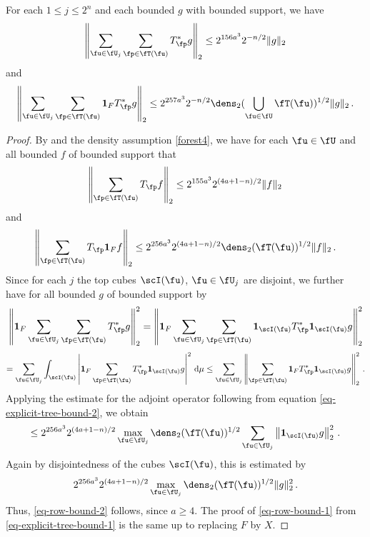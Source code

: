 \begin{lemma}
    \label{row-bound}
    For each $1 \le j \le 2^n$ and each bounded $g$ with bounded support, we have
    \begin{equation}
        \label{eq-row-bound-1}
        \left\| \sum_{\fu \in \fU_j} \sum_{\fp \in \fT(\fu)} T_{\fp}^* g\right\|_2 \le 2^{156a^3} 2^{-n/2} \|g\|_2
    \end{equation}
    and
    \begin{equation}
        \label{eq-row-bound-2}
        \left\| \sum_{\fu \in \fU_j} \sum_{\fp \in \fT(\fu)} \mathbf{1}_F T_{\fp}^* g\right\|_2 \le 2^{257a^3} 2^{-n/2} \dens_2(\bigcup_{\fu\in \fU}\fT(\fu))^{1/2} \|g\|_2\,.
    \end{equation}
\end{lemma}

\begin{proof}
    By  and the density assumption \eqref{forest4}, we have for each $\fu \in \fU$ and all bounded $f$ of bounded support that
    \begin{equation}
        \label{eq-explicit-tree-bound-1}
        \left\|\sum_{\fp \in \fT(\fu)} T_{\fp} f \right\|_{2} \le 2^{155a^3} 2^{(4a+1-n)/2} \|f\|_2\,
    \end{equation}
    and
    \begin{equation}
        \label{eq-explicit-tree-bound-2}
        \left\|\sum_{\fp \in \fT(\fu)} T_{\fp} \mathbf{1}_F f \right\|_{2} \le 2^{256a^3} 2^{(4a + 1-n)/2} \dens_2(\fT(\fu))^{1/2} \|f\|_2\,.
    \end{equation}
    Since for each $j$ the top cubes $\scI(\fu)$, $\fu \in \fU_j$ are disjoint, we further have for all bounded $g$ of bounded support by 
    $$
        \left\|\mathbf{1}_F \sum_{\fu \in \fU_j} \sum_{\fp \in \fT(\fu)} T_{\fp}^* g\right\|_2^2 = \left\|\mathbf{1}_F \sum_{\fu \in \fU_j} \sum_{\fp \in \fT(\fu)} \mathbf{1}_{\scI(\fu)} T_{\fp}^* \mathbf{1}_{\scI(\fu)} g\right\|_2^2
    $$
    $$
        = \sum_{\fu \in \fU_j} \int_{\scI(\fu)} \left| \mathbf{1}_F \sum_{\fp \in \fT(\fu)} T_{\fp}^* \mathbf{1}_{\scI(\fu)} g\right|^2 \, \mathrm{d}\mu
        \le \sum_{\fu \in \fU_j} \left\|\sum_{\fp \in \fT(\fu)} \mathbf{1}_F T_{\fp}^* \mathbf{1}_{\scI(\fu)} g\right\|_2^2\,.
    $$
    Applying the estimate for the adjoint operator following from equation \eqref{eq-explicit-tree-bound-2}, we obtain
    $$
        \le 2^{256a^3} 2^{(4a+1-n)/2} \max_{\fu \in \fU_j}\dens_2(\fT(\fu))^{1/2} \sum_{\fu \in \fU_j} \left\| \mathbf{1}_{\scI(\fu)} g\right\|_2^2\,.
    $$
    Again by disjointedness of the cubes $\scI(\fu)$, this is estimated by
    $$
        2^{256a^3} 2^{(4a+1-n)/2} \max_{\fu \in \fU_j}\dens_2(\fT(\fu))^{1/2} \|g\|_2^2\,.
    $$
    Thus, \eqref{eq-row-bound-2} follows, since $a \ge 4$.
    The proof of \eqref{eq-row-bound-1} from \eqref{eq-explicit-tree-bound-1} is the same up to replacing $F$ by $X$.
\end{proof}

